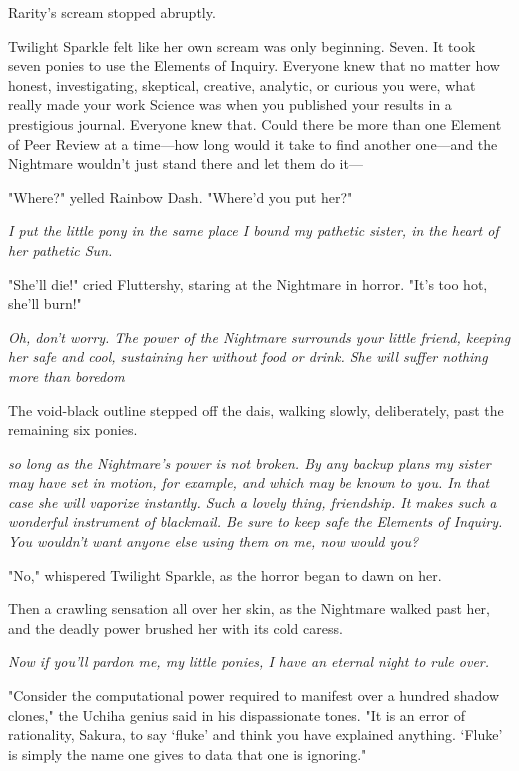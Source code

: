 Rarity's scream stopped abruptly.

Twilight Sparkle felt like her own scream was only beginning. Seven. It took
seven ponies to use the Elements of Inquiry. Everyone knew that no matter how
honest, investigating, skeptical, creative, analytic, or curious you were, what
really made your work Science was when you published your results in a
prestigious journal. Everyone knew that. Could there be more than one Element
of Peer Review at a time---how long would it take to find another one---and the
Nightmare wouldn't just stand there and let them do it---

"Where?" yelled Rainbow Dash. "Where'd you put her?"

\emph{I put the little pony in the same place I bound my pathetic sister, in
the heart of her pathetic Sun.}

"She'll die!" cried Fluttershy, staring at the Nightmare in horror. "It's too
hot, she'll burn!"

\emph{Oh, don't worry. The power of the Nightmare surrounds your little friend,
keeping her safe and cool, sustaining her without food or drink. She will
suffer nothing more than boredom{\el}}

The void-black outline stepped off the dais, walking slowly, deliberately, past
the remaining six ponies.

\emph{{\el} so long as the Nightmare's power is not broken. By any backup
plans my sister may have set in motion, for example, and which may be known to
you. In that case she will vaporize instantly. Such a lovely thing, friendship.
It makes such a wonderful instrument of blackmail. Be sure to keep safe the
Elements of Inquiry. You wouldn't want anyone else using them on me, now would
you?}

"No," whispered Twilight Sparkle, as the horror began to dawn on her.

Then a crawling sensation all over her skin, as the Nightmare walked past her,
and the deadly power brushed her with its cold caress.

\emph{Now if you'll pardon me, my little ponies, I have an eternal night to
rule over.}
\sbreak
{}

\noindent{}"Consider the computational power required to manifest over a hundred shadow
clones," the Uchiha genius said in his dispassionate tones. "It is an error of
rationality, Sakura, to say `fluke' and think you have explained anything.
`Fluke' is simply the name one gives to data that one is ignoring."

